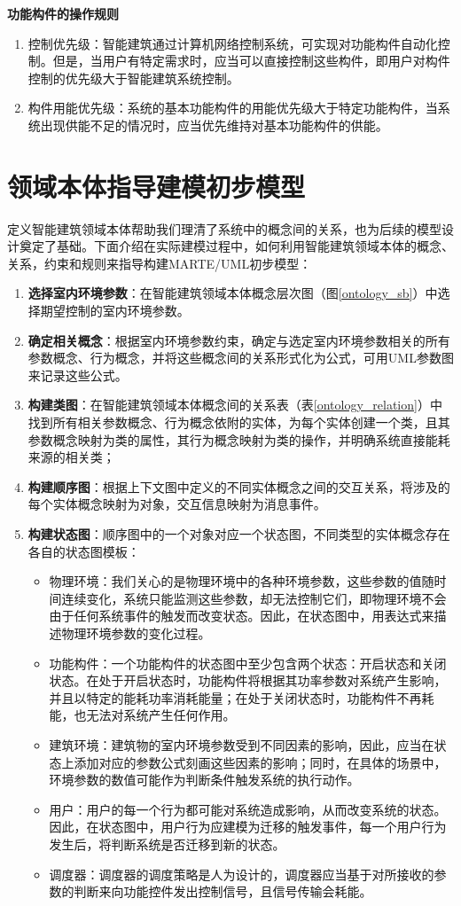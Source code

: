 	\textbf{功能构件的操作规则}
	\begin{enumerate}
	\item 控制优先级：智能建筑通过计算机网络控制系统，可实现对功能构件自动化控制。但是，当用户有特定需求时，应当可以直接控制这些构件，即用户对构件控制的优先级大于智能建筑系统控制。
	\item 构件用能优先级：系统的基本功能构件的用能优先级大于特定功能构件，当系统出现供能不足的情况时，应当优先维持对基本功能构件的供能。
	\end{enumerate}
	
\section{领域本体指导建模初步模型}
	定义智能建筑领域本体帮助我们理清了系统中的概念间的关系，也为后续的模型设计奠定了基础。下面介绍在实际建模过程中，如何利用智能建筑领域本体的概念、关系，约束和规则来指导构建MARTE/UML初步模型：
	\begin{enumerate}
	\item \textbf{选择室内环境参数}：在智能建筑领域本体概念层次图（图\ref{ontology_sb}）中选择期望控制的室内环境参数。
	\item \textbf{确定相关概念}：根据室内环境参数约束，确定与选定室内环境参数相关的所有参数概念、行为概念，并将这些概念间的关系形式化为公式，可用UML参数图来记录这些公式。
	\item \textbf{构建类图}：在智能建筑领域本体概念间的关系表（表\ref{ontology_relation}）中找到所有相关参数概念、行为概念依附的实体，为每个实体创建一个类，且其参数概念映射为类的属性，其行为概念映射为类的操作，并明确系统直接能耗来源的相关类；
	\item \textbf{构建顺序图}：根据上下文图中定义的不同实体概念之间的交互关系，将涉及的每个实体概念映射为对象，交互信息映射为消息事件。
	\item \textbf{构建状态图}：顺序图中的一个对象对应一个状态图，不同类型的实体概念存在各自的状态图模板：
	\begin{itemize}
	\item 物理环境：我们关心的是物理环境中的各种环境参数，这些参数的值随时间连续变化，系统只能监测这些参数，却无法控制它们，即物理环境不会由于任何系统事件的触发而改变状态。因此，在状态图中，用表达式来描述物理环境参数的变化过程。
	\item 功能构件：一个功能构件的状态图中至少包含两个状态：开启状态和关闭状态。在处于开启状态时，功能构件将根据其功率参数对系统产生影响，并且以特定的能耗功率消耗能量；在处于关闭状态时，功能构件不再耗能，也无法对系统产生任何作用。
	\item 建筑环境：建筑物的室内环境参数受到不同因素的影响，因此，应当在状态上添加对应的参数公式刻画这些因素的影响；同时，在具体的场景中，环境参数的数值可能作为判断条件触发系统的执行动作。
	\item 用户：用户的每一个行为都可能对系统造成影响，从而改变系统的状态。因此，在状态图中，用户行为应建模为迁移的触发事件，每一个用户行为发生后，将判断系统是否迁移到新的状态。
	\item 调度器：调度器的调度策略是人为设计的，调度器应当基于对所接收的参数的判断来向功能控件发出控制信号，且信号传输会耗能。
	\end{itemize}
	\end{enumerate}

